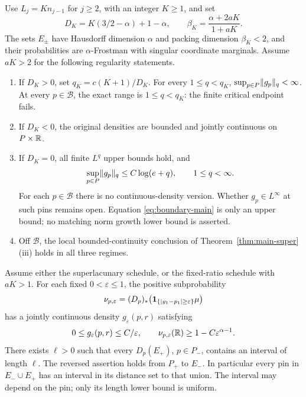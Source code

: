 \begin{theorem}\label{thm:main-fixed}
Use $L_j=K n_{j-1}$ for $j\geq2$, with an integer $K\geq1$, and set
\begin{equation}\label{eq:DK-main}
 D_K=K(3/2-\alpha)+1-\alpha,
 \qquad \beta_K=\frac{\alpha+2aK}{1+aK}.
\end{equation}
The sets $E_\pm$ have Hausdorff dimension $\alpha$ and packing dimension
$\beta_K<2$, and their probabilities are $\alpha$-Frostman with singular
coordinate marginals. Assume $aK>2$ for the following regularity statements.
\begin{enumerate}[label=(\roman*),leftmargin=*]
\item If $D_K>0$, set $q_K=c(K+1)/D_K$. For every $1\leq q<q_K$,
$\sup_{p\in P}\lVert g_p\rVert_q<\infty$. At every $p\in\mathcal B$, the
exact range is $1\leq q<q_K$: the finite critical endpoint fails.
\item If $D_K<0$, the original densities are bounded and jointly
continuous on $P\times\mathbb R$.
\item If $D_K=0$, all finite $L^q$ upper bounds hold, and
\begin{equation}\label{eq:boundary-main}
 \sup_{p\in P}\lVert g_p\rVert_q\leq C\log(e+q),\qquad 1\leq q<\infty.
\end{equation}
For each $p\in\mathcal B$ there is no continuous-density version.
Whether $g_p\in L^\infty$ at such pins remains open. Equation
\eqref{eq:boundary-main} is only an upper bound; no matching norm growth
lower bound is asserted.
\item Off $\mathcal B$, the local bounded-continuity conclusion of
Theorem~\ref{thm:main-super}(iii) holds in all three regimes.
\end{enumerate}
\end{theorem}

\begin{theorem}
\label{thm:main-intervals}
Assume either the superlacunary schedule, or the fixed-ratio schedule with
$aK>1$. For each fixed $0<\varepsilon\leq1$, the positive subprobability
\[
 \nu_{p,\varepsilon}=(D_p)_*\bigl(
 \mathbf 1_{\{|y_1-p_1|\geq\varepsilon\}}\mu\bigr)
\]
has a jointly continuous density $g_\varepsilon(p,r)$ satisfying
\[
 0\leq g_\varepsilon(p,r)\leq C/\varepsilon,
 \qquad \nu_{p,\varepsilon}(\mathbb R)\geq1-C\varepsilon^{\alpha-1}.
\]
There exists $\ell>0$ such that every $D_p(E_+)$, $p\in P_-$, contains
an interval of length $\ell$. The reversed assertion holds from $P_+$
to $E_-$. In particular every pin in $E_-\cup E_+$ has an interval in
its distance set to that union. The interval may depend on the pin;
only its length lower bound is uniform.
\end{theorem}

